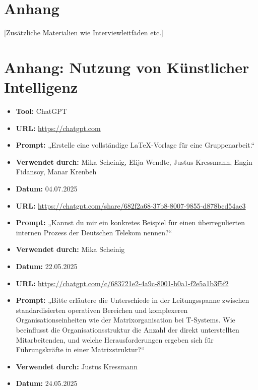 \documentclass[12pt,a4paper]{article}
\begin{document}
	\section{Anhang}
	[Zusätzliche Materialien wie Interviewleitfäden etc.]
	
	\newpage
	\section{Anhang: Nutzung von Künstlicher Intelligenz}
	\begin{itemize}
		\item \textbf{Tool:} ChatGPT
		\item \textbf{URL:} \url{https://chatgpt.com}
		\item \textbf{Prompt:} „Erstelle eine vollständige LaTeX-Vorlage für eine Gruppenarbeit.“
		\item \textbf{Verwendet durch:} Mika Scheinig, Elija Wendte, Justus Kressmann, Engin Fidansoy, Manar Krenbeh
		\item \textbf{Datum:} 04.07.2025
	\end{itemize}
	\begin{itemize}
		\item \textbf{URL:} \url{https://chatgpt.com/share/682f2a68-37b8-8007-9855-d878bcd54ae3}
		\item \textbf{Prompt:} „Kannst du mir ein konkretes Beispiel für einen überregulierten internen Prozess der Deutschen Telekom nennen?“
		\item \textbf{Verwendet durch:} Mika Scheinig
		\item \textbf{Datum:} 22.05.2025
	\end{itemize}
	
	\begin{itemize}
		\item \textbf{URL:} \url{https://chatgpt.com/c/683721e2-4a9c-8001-b0a1-f2e5a1b3f5f2}
		\item \textbf{Prompt:} „Bitte erläutere die Unterschiede in der Leitungsspanne zwischen standardisierten operativen Bereichen und komplexeren Organisationseinheiten wie der Matrixorganisation bei T-Systems. Wie beeinflusst die Organisationsstruktur die Anzahl der direkt unterstellten Mitarbeitenden, und welche Herausforderungen ergeben sich für Führungskräfte in einer Matrixstruktur?“
		\item \textbf{Verwendet durch:} Justus Kressmann
		\item \textbf{Datum:} 24.05.2025
	\end{itemize}
	
\end{document}
